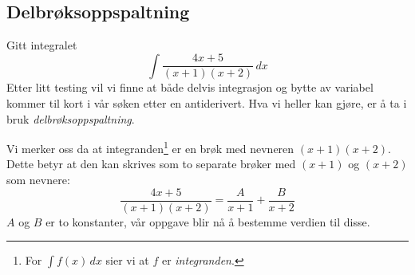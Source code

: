 \newpage
{}
\subsection{Delbrøksoppspaltning}
Gitt integralet
\[\int  \frac{4x+5}{(x+1)(x+2)} \,dx \]
Etter litt testing vil vi finne at både delvis integrasjon og bytte av variabel kommer til kort i vår søken etter en antiderivert. Hva vi heller kan gjøre, er å ta i bruk \textit{delbrøksoppspaltning}. \vsk

Vi merker oss da at integranden\footnote{For $ \int f(x)\,dx $ sier vi at $ f $ er \textit{integranden}.} er en brøk med nevneren $ (x+1)(x+2) $. Dette betyr at den kan skrives som to separate brøker med $ (x+1) $ og $ (x+2) $ som nevnere:
\begin{equation}
\frac{4x+5}{(x+1)(x+2)} = \frac{A}{x+1}+\frac{B}{x+2} \label{delbr}
\end{equation}
$ A $ og $ B $ er to konstanter, vår oppgave blir nå å bestemme verdien til disse.\vsk

